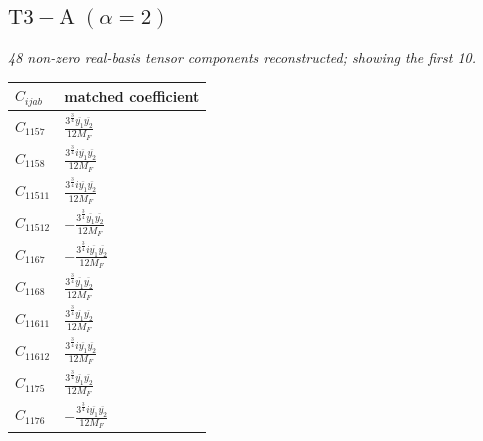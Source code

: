 \documentclass[9pt]{article}
\begin{document}
\subsection*{$ \mathrm{T3-A}\;(\alpha=2) $}
\textit{48 non-zero real-basis tensor components reconstructed; showing the first 10.}
\begin{longtable}{@{}ll@{}}
\toprule
$C_{ijab}$ & matched coefficient \\
\midrule
$C_{1157}$ & $ \frac{3^{\frac{3}{4}} \overline{y_{1}} \overline{y_{2}}}{12 M_F} $ \\
$C_{1158}$ & $ \frac{3^{\frac{3}{4}} i \overline{y_{1}} \overline{y_{2}}}{12 M_F} $ \\
$C_{11511}$ & $ \frac{3^{\frac{3}{4}} i \overline{y_{1}} \overline{y_{2}}}{12 M_F} $ \\
$C_{11512}$ & $ - \frac{3^{\frac{3}{4}} \overline{y_{1}} \overline{y_{2}}}{12 M_F} $ \\
$C_{1167}$ & $ - \frac{3^{\frac{3}{4}} i \overline{y_{1}} \overline{y_{2}}}{12 M_F} $ \\
$C_{1168}$ & $ \frac{3^{\frac{3}{4}} \overline{y_{1}} \overline{y_{2}}}{12 M_F} $ \\
$C_{11611}$ & $ \frac{3^{\frac{3}{4}} \overline{y_{1}} \overline{y_{2}}}{12 M_F} $ \\
$C_{11612}$ & $ \frac{3^{\frac{3}{4}} i \overline{y_{1}} \overline{y_{2}}}{12 M_F} $ \\
$C_{1175}$ & $ \frac{3^{\frac{3}{4}} \overline{y_{1}} \overline{y_{2}}}{12 M_F} $ \\
$C_{1176}$ & $ - \frac{3^{\frac{3}{4}} i \overline{y_{1}} \overline{y_{2}}}{12 M_F} $ \\
\bottomrule
\end{longtable}
\end{document}
